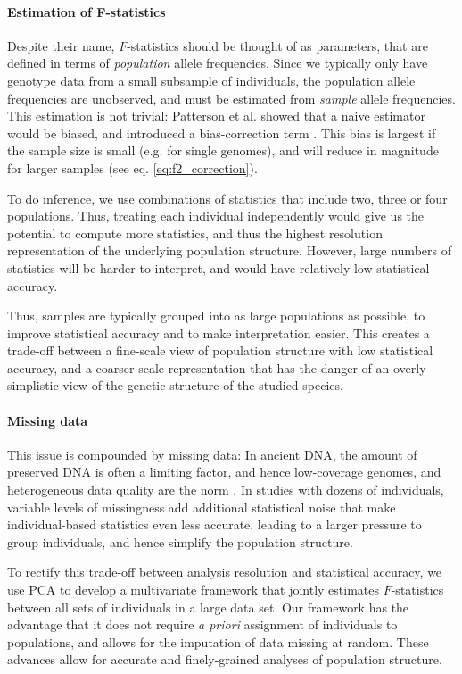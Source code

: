 \documentclass[12pt, letterpaper]{article}
\begin{document}
\paragraph{Estimation of F-statistics}\label{intro-fstats-estimation}
Despite their name, $F$-statistics should be thought of as parameters, that are defined in terms of \textit{population} allele frequencies. Since we typically only have genotype data from a small subsample of individuals, the population allele frequencies are unobserved, and must be estimated from \textit{sample} allele frequencies. This estimation is not trivial: Patterson et al. showed that a naive estimator would be biased, and introduced a bias-correction term \cite{patterson_ancient_2012}. This bias is largest if the sample size is small (e.g. for single genomes), and will reduce in magnitude for larger samples (see eq. \ref{eq:f2_correction}). 

To do inference, we use combinations of statistics that include two, three or four populations. Thus, treating each individual independently would give us the potential to compute more statistics, and thus the highest resolution representation of the underlying population structure. However, large numbers of statistics will be harder to interpret, and would have relatively low statistical accuracy. 

Thus, samples are typically grouped into as  large populations  as possible, to improve statistical accuracy and to make interpretation easier. This creates a trade-off between a fine-scale view of population structure with low statistical accuracy, and a coarser-scale representation that has the danger of an overly simplistic view of the genetic structure of the studied species.

\paragraph{Missing data}
This issue is compounded by missing data: In ancient DNA, the amount of preserved DNA is often a limiting factor, and hence low-coverage genomes, and heterogeneous data quality are the norm \cite{orlando_ancient_2021}. In studies with dozens of individuals, variable levels of missingness add additional statistical noise that make individual-based statistics even less accurate, leading to a larger pressure to group individuals, and hence simplify the population structure. 

To rectify this trade-off between analysis resolution and statistical accuracy, we use PCA to develop a multivariate framework that jointly estimates $F$-statistics between all sets of individuals in a large data set. Our framework has the advantage that it does not require \textit{a priori} assignment of individuals to populations, and allows for the imputation of data missing at random. These advances allow for accurate and finely-grained analyses of population structure.
\end{document}
